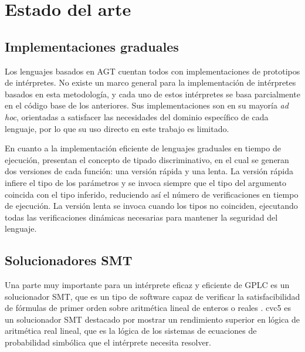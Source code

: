 
\chapter{Estado del arte}\label{sec:estado}


\section{Implementaciones graduales}

Los lenguajes basados en AGT \citep{agt, union, toro2018, param, system-f, sensitivity} cuentan todos con implementaciones de prototipos de intérpretes. No existe un marco general para la implementación de intérpretes basados en esta metodología, y cada uno de estos intérpretes se basa parcialmente en el código base de los anteriores. Sus implementaciones son en su mayoría \emph{ad hoc}, orientadas a satisfacer las necesidades del dominio específico de cada lenguaje, por lo que su uso directo en este trabajo es limitado.

En cuanto a la implementación eficiente de lenguajes graduales en tiempo de ejecución, \citet{campora} presentan el concepto de tipado discriminativo, en el cual se generan dos versiones de cada función: una versión rápida y una lenta. La versión rápida infiere el tipo de los parámetros y se invoca siempre que el tipo del argumento coincida con el tipo inferido, reduciendo así el número de verificaciones en tiempo de ejecución. La versión lenta se invoca cuando los tipos no coinciden, ejecutando todas las verificaciones dinámicas necesarias para mantener la seguridad del lenguaje.

\section{Solucionadores SMT}

Una parte muy importante para un intérprete eficaz y eficiente de GPLC es un solucionador SMT, que es un tipo de software capaz de verificar la satisfacibilidad de fórmulas de primer orden sobre aritmética lineal de enteros o reales \citep{monniaux}. cvc5 \citep{cvc5} es un solucionador SMT destacado por mostrar un rendimiento superior en lógica de aritmética real lineal, que es la lógica de los sistemas de ecuaciones de probabilidad simbólica que el intérprete necesita resolver.

